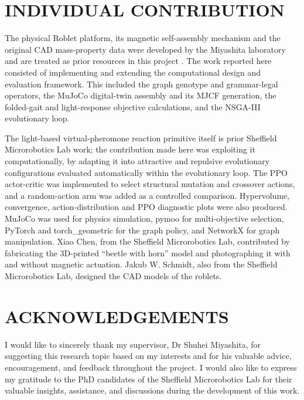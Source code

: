 \documentclass[12pt,a4paper]{report}
\begin{document}
\newpage \section*{INDIVIDUAL CONTRIBUTION}
The physical Roblet platform, its magnetic self-assembly mechanism and the original CAD mass-property data were developed by the Miyashita laboratory and are treated as prior resources in this project \citep{han2023roblets}. The work reported here consisted of implementing and extending the computational design and evaluation framework. This included the graph genotype and grammar-legal operators, the MuJoCo digital-twin assembly and its MJCF generation, the folded-gait and light-response objective calculations, and the NSGA-III evolutionary loop.

The light-based virtual-pheromone reaction primitive itself is prior Sheffield Microrobotics Lab work; the contribution made here was exploiting it computationally, by adapting it into attractive and repulsive evolutionary configurations evaluated automatically within the evolutionary loop. The PPO actor-critic was implemented to select structural mutation and crossover actions, and a random-action arm was added as a controlled comparison. Hypervolume, convergence, action-distribution and PPO diagnostic plots were also produced. MuJoCo was used for physics simulation, pymoo for multi-objective selection, PyTorch and torch\_geometric for the graph policy, and NetworkX for graph manipulation. Xiao Chen, from the Sheffield Microrobotics Lab, contributed by fabricating the 3D-printed ``beetle with horn'' model and photographing it with and without magnetic actuation. Jakub W. Schmidt, also from the Sheffield Microrobotics Lab, designed the CAD models of the roblets.


\newpage \section*{ACKNOWLEDGEMENTS}
I would like to sincerely thank my supervisor, Dr Shuhei Miyashita, for suggesting this research topic based on my interests and for his valuable advice, encouragement, and feedback throughout the project. I would also like to express my gratitude to the PhD candidates of the Sheffield Microrobotics Lab for their valuable insights, assistance, and discussions during the development of this work.

\tableofcontents
\listoffigures  %
\listoftables
\end{document}
